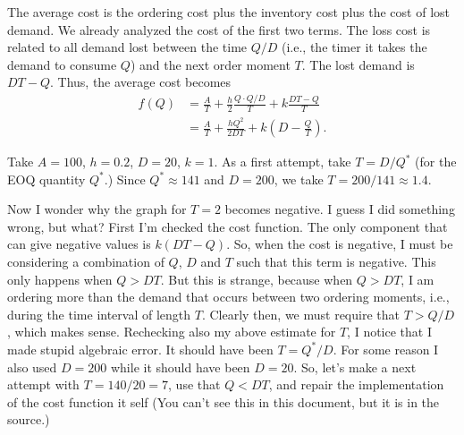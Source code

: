 \begin{question}
\begin{solution}
\begin{center}
\end{center}

The average cost is the ordering cost plus the inventory cost plus the
cost of lost demand. We already analyzed the cost of the first two
terms. The loss cost is related to all demand lost between the time
$Q/D$ (i.e., the timer it takes the demand to consume $Q$) and the
next order moment $T$. The lost demand is
$DT-Q$. Thus, the average cost becomes
\begin{equation*}
  \begin{split}
  f(Q) 
&= \frac A T + \frac h2 \frac{Q\cdot Q/D}{T}+k \frac{DT-Q}T \\
&= \frac A T + \frac{hQ^2}{2DT}+k (D-\frac QT). 
  \end{split}
\end{equation*}

Take $A=100$, $h=0.2$, $D=20$, $k=1$. As a first attempt, take $T=D/Q^*$ (for the EOQ quantity $Q^*$.) Since $Q^* \approx 141$ and $D=200$, we take $T=200/141\approx 1.4$. 

\begin{center}
\end{center}

Now I wonder why the graph for $T=2$ becomes negative. I guess I did
something wrong, but what?  First I'm checked the cost function. The
only component that can give negative values is
$k(DT-Q)$.  So, when the cost is negative,
I must be considering a combination of $Q$, $D$ and $T$ such that this
term is negative. This only happens when $Q>DT$. But this is strange,
because when $Q>DT$, I am ordering more than the demand that occurs
between two ordering moments, i.e., during the time interval of length
$T$. Clearly then, we must require that $T>Q/D$, which makes
sense. Rechecking also my above estimate for $T$, I notice that I made
stupid algebraic error. It should have been $T=Q^*/D$. For some reason
I also used $D=200$ while it should have been $D=20$. So, let's make a
next attempt with $T=140/20=7$,  use that $Q<DT$, and repair the implementation of the cost function it self (You can't see this in this document, but it is in the source.)


\end{solution}
\end{question}
